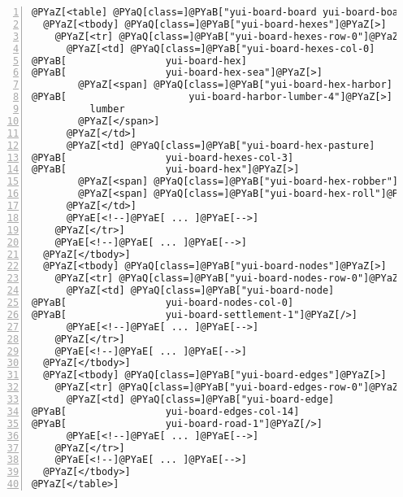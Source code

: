 \begin{Verbatim}[commandchars=@\[\],numbers=left,firstnumber=1,stepnumber=1]
@PYaZ[<table] @PYaQ[class=]@PYaB["yui-board-board yui-board-board-size-7-7"]@PYaZ[>]
  @PYaZ[<tbody] @PYaQ[class=]@PYaB["yui-board-hexes"]@PYaZ[>]
    @PYaZ[<tr] @PYaQ[class=]@PYaB["yui-board-hexes-row-0"]@PYaZ[>]
      @PYaZ[<td] @PYaQ[class=]@PYaB["yui-board-hexes-col-0]
@PYaB[                 yui-board-hex]
@PYaB[                 yui-board-hex-sea"]@PYaZ[>]
        @PYaZ[<span] @PYaQ[class=]@PYaB["yui-board-hex-harbor]
@PYaB[                     yui-board-harbor-lumber-4"]@PYaZ[>]
          lumber
        @PYaZ[</span>]
      @PYaZ[</td>]
      @PYaZ[<td] @PYaQ[class=]@PYaB["yui-board-hex-pasture]
@PYaB[                 yui-board-hexes-col-3]
@PYaB[                 yui-board-hex"]@PYaZ[>]
        @PYaZ[<span] @PYaQ[class=]@PYaB["yui-board-hex-robber"]@PYaZ[>]robber@PYaZ[</span>]
        @PYaZ[<span] @PYaQ[class=]@PYaB["yui-board-hex-roll"]@PYaZ[>]5@PYaZ[</span>]
      @PYaZ[</td>]
      @PYaE[<!--]@PYaE[ ... ]@PYaE[-->]
    @PYaZ[</tr>]
    @PYaE[<!--]@PYaE[ ... ]@PYaE[-->]
  @PYaZ[</tbody>]
  @PYaZ[<tbody] @PYaQ[class=]@PYaB["yui-board-nodes"]@PYaZ[>]
    @PYaZ[<tr] @PYaQ[class=]@PYaB["yui-board-nodes-row-0"]@PYaZ[>]
      @PYaZ[<td] @PYaQ[class=]@PYaB["yui-board-node]
@PYaB[                 yui-board-nodes-col-0]
@PYaB[                 yui-board-settlement-1"]@PYaZ[/>]
      @PYaE[<!--]@PYaE[ ... ]@PYaE[-->]
    @PYaZ[</tr>]
    @PYaE[<!--]@PYaE[ ... ]@PYaE[-->]
  @PYaZ[</tbody>]
  @PYaZ[<tbody] @PYaQ[class=]@PYaB["yui-board-edges"]@PYaZ[>]
    @PYaZ[<tr] @PYaQ[class=]@PYaB["yui-board-edges-row-0"]@PYaZ[>]
      @PYaZ[<td] @PYaQ[class=]@PYaB["yui-board-edge]
@PYaB[                 yui-board-edges-col-14]
@PYaB[                 yui-board-road-1"]@PYaZ[/>]
      @PYaE[<!--]@PYaE[ ... ]@PYaE[-->]
    @PYaZ[</tr>]
    @PYaE[<!--]@PYaE[ ... ]@PYaE[-->]
  @PYaZ[</tbody>]
@PYaZ[</table>]
\end{Verbatim}

